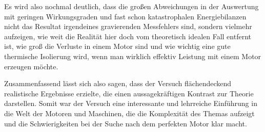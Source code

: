 \documentclass{article}
\begin{document}
Es wird also nochmal deutlich, dass die großen Abweichungen in der Auswertung mit geringen Wirkungsgraden und fast schon katastrophalen Energiebilanzen nicht das Resultat irgendeines gravierenden Messfehlers sind, sondern vielmehr aufzeigen, wie weit die Realität hier doch vom theoretisch idealen Fall entfernt ist, wie groß die Verluste in einem Motor sind und wie wichtig eine gute thermische Isolierung wird, wenn man wirklich effektiv Leistung mit einem Motor erzeugen möchte.

Zusammenfassend lässt sich also sagen, dass der Versuch flächendeckend realistische Ergebnisse erzielte, die einen aussagekräftigen Kontrast zur Theorie darstellen. Somit war der Versuch eine interessante und lehrreiche Einführung in die Welt der Motoren und Maschinen, die die Komplexität des Themas aufzeigt und die Schwierigkeiten bei der Suche nach dem perfekten Motor klar macht.



\newpage

\end{document}

